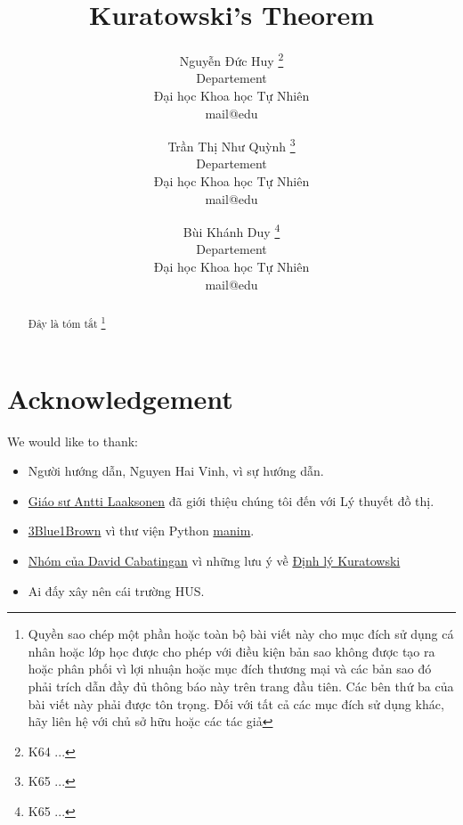 \documentclass[12pt]{article}
\title{\textbf{Kuratowski's Theorem}}
\author{
    Nguyễn Đức Huy \thanks{K64 ...}\\
    Departement \\
    Đại học Khoa học Tự Nhiên \\
    mail@edu
    \and
    Trần Thị Như Quỳnh \thanks{K65 ...} \\
    Departement \\
    Đại học Khoa học Tự Nhiên \\
    mail@edu
    \and
    Bùi Khánh Duy \thanks{K65 ...}\\
    Departement \\
    Đại học Khoa học Tự Nhiên \\
    mail@edu
}
\begin{document}
\begin{titlepage}
    \maketitle
    \begin{abstract}
        Đây là tóm tắt \footnote{Quyền sao chép một phần hoặc toàn bộ bài viết này cho mục đích sử dụng cá nhân hoặc lớp học được cho phép với điều kiện bản sao không được tạo ra hoặc phân phối vì lợi nhuận hoặc mục đích thương mại và các bản sao đó phải trích dẫn đầy đủ thông báo này trên trang đầu tiên. Các bên thứ ba của bài viết này phải được tôn trọng. Đối với tất cả các mục đích sử dụng khác, hãy liên hệ với chủ sở hữu hoặc các tác giả}
    \end{abstract}
\end{titlepage}

\begin{titlepage}
    \tableofcontents
\end{titlepage}








\section*{Acknowledgement}
We would like to thank:
\begin{itemize}
    \item Người hướng dẫn, Nguyen Hai Vinh, vì sự hướng dẫn.
    \item \href{https://cses.fi/book/book.pdf}{Giáo sư Antti Laaksonen} đã giới thiệu chúng tôi đến với Lý thuyết đồ thị.
    \item \href{https://www.youtube.com/channel/UCYO_jab_esuFRV4b17AJtAw}{3Blue1Brown} vì thư viện Python \href{https://github.com/dcabatin/manim}{manim}.
    \item \href{https://www.youtube.com/watch?v=DOnY6eZi2E8}{Nhóm của David Cabatingan} vì những lưu ý về \hyperref[thr:kuratowski]{Định lý Kuratowski}
    \item Ai đấy xây nên cái trường HUS.
\end{itemize}
\end{document}
